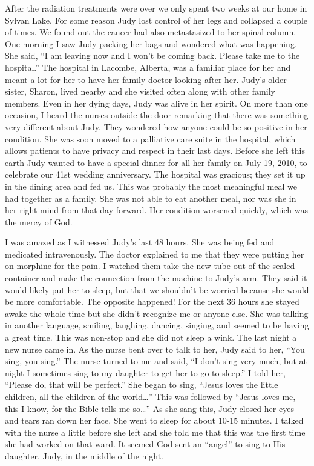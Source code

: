 \documentclass[twoside, 12pt]{book}
\begin{document}
After the radiation treatments were over we only spent two weeks at our home in Sylvan Lake. For some reason Judy lost control of her legs and collapsed a couple of times. We found out the cancer had also metastasized to her spinal column. One morning I saw Judy packing her bags and wondered what was happening. She said, “I am leaving now and I won’t be coming back. Please take me to the hospital.” The hospital in Lacombe, Alberta, was a familiar place for her and meant a lot for her to have her family doctor looking after her. Judy’s older sister, Sharon, lived nearby and she visited often along with other family members. Even in her dying days, Judy was alive in her spirit. On more than one occasion, I heard the nurses outside the door remarking that there was something very different about Judy. They wondered how anyone could be so positive in her condition. She was soon moved to a palliative care suite in the hospital, which allows patients to have privacy and respect in their last days.
Before she left this earth Judy wanted to have a special dinner for all her family on July 19, 2010, to celebrate our 41st wedding anniversary. The hospital was gracious; they set it up in the dining area and fed us. This was probably the most meaningful meal we had together as a family. She was not able to eat another meal, nor was she in her right mind from that day forward. Her condition worsened quickly, which was the mercy of God. 

I was amazed as I witnessed Judy’s last 48 hours. She was being fed and medicated intravenously. The doctor explained to me that they were putting her on morphine for the pain. I watched them take the new tube out of the sealed container and make the connection from the machine to Judy’s arm. They said it would likely put her to sleep, but that we shouldn’t be worried because she would be more comfortable. The opposite happened! For the next 36 hours she stayed awake the whole time but she didn’t recognize me or anyone else. She was talking in another language, smiling, laughing, dancing, singing, and seemed to be having a great time. This was non-stop and she did not sleep a wink. The last night a new nurse came in.  As the nurse bent over to talk to her, Judy said to her, “You sing, you sing.” The nurse turned to me and said, “I don’t sing very much, but at night I sometimes sing to my daughter to get her to go to sleep.” I told her, “Please do, that will be perfect.” She began to sing, “Jesus loves the little children, all the children of the world…” This was followed by “Jesus loves me, this I know, for the Bible tells me so…” As she sang this, Judy closed her eyes and tears ran down her face. She went to sleep for about 10-15 minutes. I talked with the nurse a little before she left and she told me that this was the first time she had worked on that ward. It seemed God sent an “angel” to sing to His daughter, Judy, in the middle of the night. 
\end{document}

